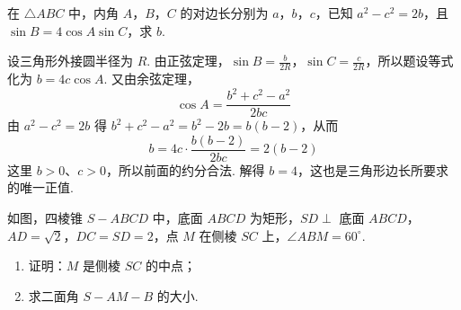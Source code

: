 \begin{problem}
在 \(\triangle ABC\) 中，内角 \(A\)，\(B\)，\(C\) 的对边长分别为 \(a\)，\(b\)，\(c\)，已知 \(a^{2} - c^{2} = 2b\)，且 \(\sin B = 4\cos A \sin C\)，求 \(b\).
\end{problem}

\begin{solution}
设三角形外接圆半径为 \(R\). 由正弦定理，\(\sin B=\frac{b}{2R}\)，\(\sin C=\frac{c}{2R}\)，所以题设等式化为 \(b=4c\cos A\). 又由余弦定理，
\[
\cos A=\frac{b^2+c^2-a^2}{2bc}
\]
由 \(a^2-c^2=2b\) 得 \(b^2+c^2-a^2=b^2-2b=b(b-2)\)，从而
\[
b=4c\cdot\frac{b(b-2)}{2bc}=2(b-2)
\]
这里 \(b>0\)、\(c>0\)，所以前面的约分合法. 解得 \(b=4\)，这也是三角形边长所要求的唯一正值.
\end{solution}

\begin{problem}
如图，四棱锥 \(S - ABCD\) 中，底面 \(ABCD\) 为矩形，\(SD \perp\) 底面 \(ABCD\)，\(AD = \sqrt{2}\)，\(DC = SD = 2\)，点 \(M\) 在侧棱 \(SC\) 上，\(\angle ABM = 60^{\circ}\).

\begin{enumerate}
\item 证明：\(M\) 是侧棱 \(SC\) 的中点；
\item 求二面角 \(S - AM - B\) 的大小.
\end{enumerate}

\end{problem}

